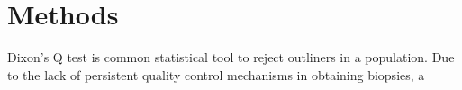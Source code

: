 \chapter{Methods}

Dixon's Q test is common statistical tool to reject outliners in a population. Due to the lack of persistent quality control mechanisms in obtaining biopsies, a